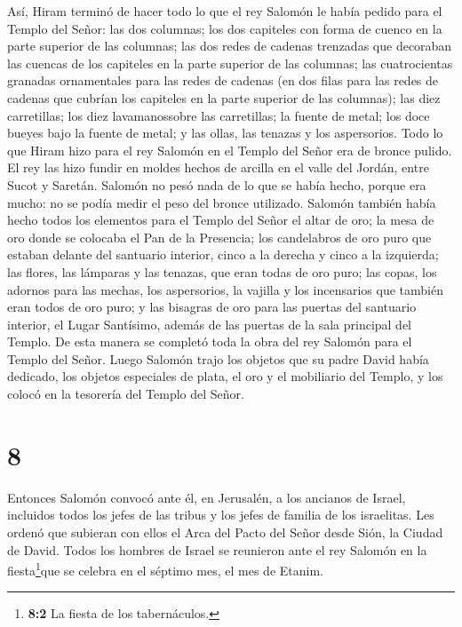 Así, Hiram terminó de hacer todo lo que el rey Salomón le había pedido
para el Templo del Señor:  las dos columnas; los dos
capiteles con forma de cuenco en la parte superior de las columnas; las
dos redes de cadenas trenzadas que decoraban las cuencas de los
capiteles en la parte superior de las columnas;  las
cuatrocientas granadas ornamentales para las redes de cadenas (en dos
filas para las redes de cadenas que cubrían los capiteles en la parte
superior de las columnas);  las diez carretillas; los diez
lavamanossobre las carretillas;  la fuente de metal; los
doce bueyes bajo la fuente de metal;  y las ollas, las
tenazas y los aspersorios. Todo lo que Hiram hizo para el rey Salomón en
el Templo del Señor era de bronce pulido.  El rey las hizo
fundir en moldes hechos de arcilla en el valle del Jordán, entre Sucot y
Saretán.  Salomón no pesó nada de lo que se había hecho,
porque era mucho: no se podía medir el peso del bronce utilizado.
 Salomón también había hecho todos los elementos para el
Templo del Señor el altar de oro; la mesa de oro donde se colocaba el
Pan de la Presencia;  los candelabros de oro puro que
estaban delante del santuario interior, cinco a la derecha y cinco a la
izquierda; las flores, las lámparas y las tenazas, que eran todas de oro
puro;  las copas, los adornos para las mechas, los
aspersorios, la vajilla y los incensarios que también eran todos de oro
puro; y las bisagras de oro para las puertas del santuario interior, el
Lugar Santísimo, además de las puertas de la sala principal del Templo.
 De esta manera se completó toda la obra del rey Salomón
para el Templo del Señor. Luego Salomón trajo los objetos que su padre
David había dedicado, los objetos especiales de plata, el oro y el
mobiliario del Templo, y los colocó en la tesorería del Templo del
Señor.

\hypertarget{section-7}{%
\section{8}\label{section-7}}

 Entonces Salomón convocó ante él, en Jerusalén, a los
ancianos de Israel, incluidos todos los jefes de las tribus y los jefes
de familia de los israelitas. Les ordenó que subieran con ellos el Arca
del Pacto del Señor desde Sión, la Ciudad de David.  Todos
los hombres de Israel se reunieron ante el rey Salomón en la
fiesta\footnote{\textbf{8:2} La fiesta de los tabernáculos.}que se
celebra en el séptimo mes, el mes de Etanim.

